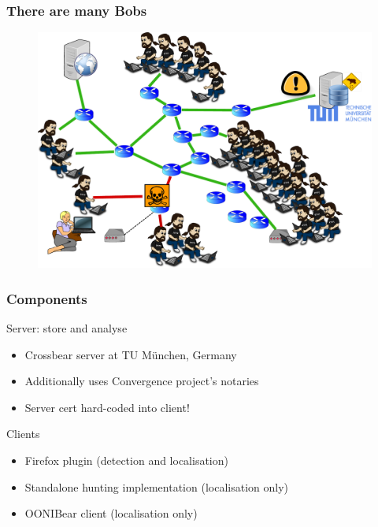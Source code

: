 \begin{frame}
  \frametitle{There are many Bobs}
  \begin{block}{}
    \vskip -1.2cm
    \begin{figure}[t]
      \centering
      \includegraphics[scale=.36]{figures/hunting-4-manyreporting}
    \end{figure}
  \end{block}
\end{frame}

\begin{frame}
  \frametitle{Components}
  \begin{block}{Server: store and analyse}
    \begin{itemize}
    \item Crossbear server at TU M{\"u}nchen, Germany
    \item Additionally uses Convergence project's notaries
    \item Server cert hard-coded into client!
    \end{itemize}
  \end{block}
  \begin{block}{Clients}
    \begin{itemize}
    \item Firefox plugin (detection and localisation)
    \item Standalone hunting implementation (localisation only)
    \item OONIBear client (localisation only)
    \end{itemize}
  \end{block}
\end{frame}


